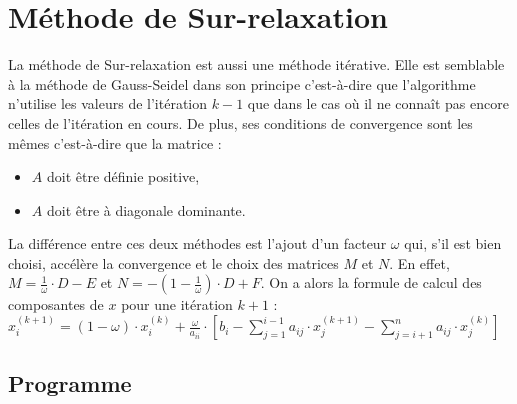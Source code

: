 \documentclass{report}
\begin{document}
    \section{Méthode de Sur-relaxation}
    La méthode de Sur-relaxation est aussi une méthode itérative. Elle est semblable à la méthode de Gauss-Seidel dans son principe c'est-à-dire que l'algorithme n'utilise les valeurs de l'itération $k-1$ que dans le cas où il ne connaît pas encore celles de l'itération en cours.
    \newline
    De plus, ses conditions de convergence sont les mêmes c'est-à-dire que la matrice :
          \begin{itemize}
        \item{$A$ doit être définie positive,}
        \item{$A$ doit être à diagonale dominante.}
      \end{itemize}
    La différence entre ces deux méthodes est l'ajout d'un facteur $ \omega $ qui, s'il est bien choisi, accélère la convergence et le choix des matrices $M$ et $N$. 
    \newline
    En effet, $M = \frac{1}{\omega} \cdot D - E$ et $N = - \left( 1- \frac{1}{\omega} \right) \cdot D + F $.
    \newline
    On a alors la formule de calcul des composantes de $x$ pour une itération $k+1$ :
    \newline
    $x_{i}^{(k+1)} = (1 - \omega) \cdot x_{i}^{(k)} +  \frac{\omega}{a_{ii}} \cdot \left [ b_{i} - \sum_{j=1}^{i-1} a_{ij} \cdot x_{j}^{(k+1)} - \sum_{j=i+1}^{n} a_{ij} \cdot x_{j}^{(k)} \right ] $
      \newline
      \subsection{Programme}
        
  
\end{document}
